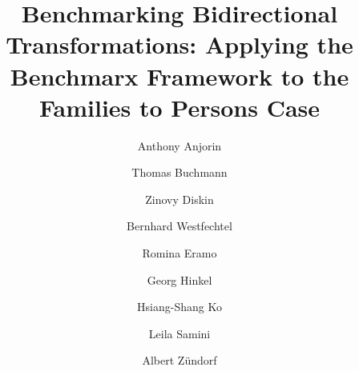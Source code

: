 \title{Benchmarking Bidirectional Transformations: Applying the Benchmarx Framework to the Families to Persons Case}


\author{Anthony Anjorin \and Thomas Buchmann \and Zinovy Diskin \and Bernhard Westfechtel \and
	Romina Eramo \and Georg Hinkel \and Hsiang-Shang Ko \and Leila Samini \and Albert Z{\"u}ndorf
}
